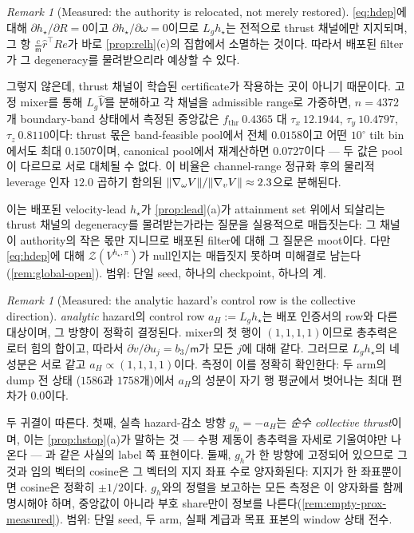 \documentclass[11pt]{article}
\theoremstyle{plain}
\theoremstyle{definition}
\theoremstyle{remark}
\newtheorem{remark}[theorem]{Remark}
\DeclarePairedDelimiter{\norm}{\lVert}{\rVert}
\newcommand{\Vhat}{\widehat V}
\newcommand{\mass}{\mathsf m}
\newcommand{\Lg}{L_g}
\newcommand{\grad}{\nabla}
\newcommand{\eqdef}{:=}
\begin{document}
\begin{remark}[Measured: the authority is relocated, not merely restored]\label{rem:hstar-resolved}
\cref{eq:hdep}에 대해 $\partial h_\star/\partial R=0$이고 $\partial h_\star/\partial\omega=0$이므로
$\Lg h_\star$는 전적으로 thrust 채널에만 지지되며, 그 항 $\tfrac{c}{\mass}\hat r^\top Re$가 바로
\cref{prop:relh}(c)의 집합에서 소멸하는 것이다. 따라서 배포된 filter가 그 degeneracy를 물려받으리라
예상할 수 있다.

그렇지 않은데, thrust 채널이 학습된 certificate가 작용하는 곳이 아니기 때문이다. 고정 mixer를 통해
$\Lg\Vhat$를 분해하고 각 채널을 admissible range로 가중하면, $n=4372$개 boundary-band 상태에서
측정된 중앙값은 $f_{\mathrm{thr}}\ 0.4365$ 대 $\tau_x\ 12.1944$, $\tau_y\ 10.4797$,
$\tau_z\ 0.8110$이다: thrust 몫은 band-feasible pool에서 전체 $0.0158$이고 어떤 $10^\circ$ tilt
bin에서도 최대 $0.1507$이며, canonical pool에서 재계산하면 $0.0727$이다 --- 두 값은 pool이 다르므로
서로 대체될 수 없다. 이 비율은 channel-range 정규화 후의 물리적 leverage 인자 $12.0$ 곱하기
함의된 $\norm{\grad_\omega V}/\norm{\grad_v V}\approx2.3$으로 분해된다.

이는 배포된 velocity-lead $h_\star$가 \cref{prop:lead}(a)가 attainment set 위에서 되살리는 thrust
채널의 degeneracy를 물려받는가라는 질문을 실용적으로 매듭짓는다: 그 채널이 authority의 작은 몫만
지니므로 배포된 filter에 대해 그 질문은 moot이다. 다만 \cref{eq:hdep}에 대해
$\mathcal Z(V^{h_\star,\pi})$가 null인지는 매듭짓지 못하며 미해결로 남는다(\cref{rem:global-open}).
범위: 단일 seed, 하나의 checkpoint, 하나의 계.
\end{remark}

\begin{remark}[Measured: the analytic hazard's control row is the collective direction]\label{rem:ah-collective}
\emph{analytic} hazard의 control row $a_H\eqdef\Lg h_\star$는 배포 인증서의 row와 다른 대상이며,
그 방향이 정확히 결정된다. mixer의 첫 행이 $(1,1,1,1)$이므로 총추력은 로터 힘의 합이고, 따라서
$\partial\dot v/\partial u_j=b_3/\mass$가 모든 $j$에 대해 같다. 그러므로 $\Lg h_\star$의 네 성분은
서로 같고 $a_H\propto(1,1,1,1)$이다. 측정이 이를 정확히 확인한다: 두 arm의 dump 전 상태
($1586$과 $1758$개)에서 $a_H$의 성분이 자기 행 평균에서 벗어나는 최대 편차가 $0.0$이다.

두 귀결이 따른다. 첫째, 실측 hazard-감소 방향 $g_h=-a_H$는 \emph{순수 collective thrust}이며,
이는 \cref{prop:hstop}(a)가 말하는 것 --- 수평 제동이 총추력을 자세로 기울여야만 나온다 --- 과
같은 사실의 label 쪽 표현이다. 둘째, $g_h$가 한 방향에 고정되어 있으므로 그것과 임의 벡터의
cosine은 그 벡터의 지지 좌표 수로 양자화된다: 지지가 한 좌표뿐이면 cosine은 정확히 $\pm1/2$이다.
$g_h$와의 정렬을 보고하는 모든 측정은 이 양자화를 함께 명시해야 하며, 중앙값이 아니라 부호
share만이 정보를 나른다(\cref{rem:empty-prox-measured}).
범위: 단일 seed, 두 arm, 실패 계급과 목표 표본의 window 상태 전수.
\end{remark}
\end{document}
